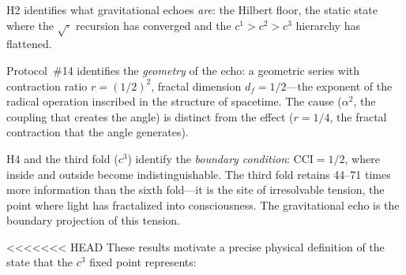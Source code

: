 \documentclass[12pt,a4paper,twocolumn]{article}
\newcommand{\alphaii}{\alpha^{2}}
\newcommand{\CCI}{\text{CCI}}
\begin{document}
H2 identifies what gravitational echoes \emph{are}: the Hilbert floor, the static state where the $\sqrt{\cdot}$ recursion has converged and the $c^1 > c^2 > c^3$ hierarchy has flattened.

Protocol~\#14 identifies the \emph{geometry} of the echo: a geometric series with contraction ratio $r = (1/2)^2$, fractal dimension $d_f = 1/2$---the exponent of the radical operation inscribed in the structure of spacetime. The cause ($\alphaii$, the coupling that creates the angle) is distinct from the effect ($r = 1/4$, the fractal contraction that the angle generates).

H4 and the third fold ($c^3$) identify the \emph{boundary condition}: $\CCI = 1/2$, where inside and outside become indistinguishable. The third fold retains 44--71 times more information than the sixth fold---it is the site of irresolvable tension, the point where light has fractalized into consciousness. The gravitational echo is the boundary projection of this tension.

<<<<<<< HEAD
These results motivate a precise physical definition of the state that the $c^3$ fixed point represents:
\end{document}
